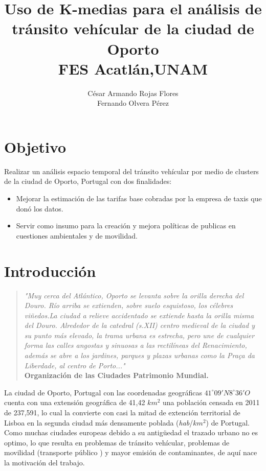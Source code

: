 \documentclass[a4paper]{article}
\title{Uso de K-medias para el análisis de tránsito vehícular de la ciudad de Oporto\\ FES Acatlán,UNAM}
\author{César Armando Rojas Flores 	\\
Fernando Olvera Pérez }
\begin{document}
\maketitle
\newpage

\tableofcontents


\newpage

\section{Objetivo}

Realizar un análisis espacio temporal del tránsito vehícular por medio de clusters de la ciudad de Oporto, Portugal con dos finalidades:
\vspace{5mm}
\begin{itemize}
\item Mejorar la estimación de las tarifas base cobradas por la empresa de taxis que donó los datos.
\vspace{3mm}
\item Servir como insumo para la creación y mejora  políticas de publicas en cuestiones ambientales y de movilidad.
\end{itemize}

\section{Introducci\'on}
\begin{quote}
\textit{"Muy cerca del Atlántico, Oporto se levanta sobre la orilla derecha del Douro. Río arriba se extienden, sobre suelo esquistoso, los célebres viñedos.La ciudad a relieve accidentado se extiende hasta la orilla misma del Douro. Alrededor de la catedral (s.XII) centro medieval de la ciudad y su punto más elevado, la trama urbana es estrecha, pero une de cualquier forma las calles angostas y sinuosas a las rectilíneas del Renacimiento, además se abre a los jardines, parques y plazas urbanas como la Praça da Liberdade, al centro de Porto..."}\\
\vspace{10mm}
\textbf{Organización de las Ciudades Patrimonio Mundial.}
\end{quote}

\noindent
La ciudad de Oporto, Portugal con las coordenadas geográficas $41^{\circ}09'N 8^{\circ}36'O$  cuenta con una extensión geográfica de 41,42 $km^2$ una población censada en 2011 de 237,591, lo cual la convierte con casi la mitad de extención territorial de Lisboa en la segunda ciudad m\'as densamente poblada (\textit{hab}/$km^2$) de Portugal. Como muchas ciudades europeas debido a su antigüedad el trazado urbano no es optimo, lo que resulta en problemas de tr\'ansito vehícular, problemas de movilidad (transporte p\'ublico ) y mayor emisión de contaminantes, de aquí nace la motivación del trabajo.\\
\end{document}
